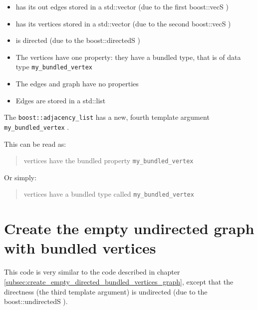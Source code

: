 \begin{itemize}
  \item has its out edges stored in a std::vector 
    (due to the first boost::vecS )
  \item has its vertices stored in a std::vector 
    (due to the second boost::vecS )
  \item is directed 
    (due to the boost::directedS )
  \item The vertices have one property: 
    they have a bundled type, 
    that is of data type \verb;my_bundled_vertex;
  \item The edges and graph have no properties
  \item Edges are stored in a std::list
\end{itemize}

The \verb;boost::adjacency_list; has a new, fourth template argument 
\verb;my_bundled_vertex; .

This can be read as: 

\begin{quote}
vertices have the bundled property \verb;my_bundled_vertex;
\end{quote}

Or simply: 

\begin{quote}
vertices have a bundled type called \verb;my_bundled_vertex;
\end{quote}

\section{Create the empty undirected graph with bundled vertices}
\label{subsec:create_empty_undirected_bundled_vertices_graph}



This code is very similar to the code described 
in chapter \ref{subsec:create_empty_directed_bundled_vertices_graph}, 
except that the directness (the third template argument) is undirected 
(due to the boost::undirectedS ).


